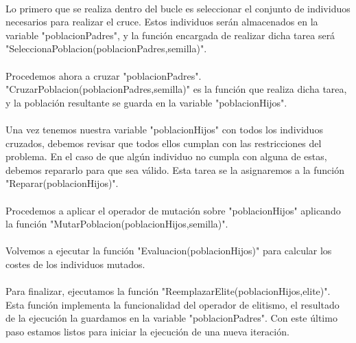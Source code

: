 	\paragraph{}Lo primero que se realiza dentro del bucle es seleccionar el conjunto de individuos necesarios para realizar el cruce. Estos individuos serán almacenados en la variable "poblacionPadres", y la función encargada de realizar dicha tarea será "SeleccionaPoblacion(poblacionPadres,semilla)".

	\paragraph{}Procedemos ahora a cruzar "poblacionPadres". "CruzarPoblacion(poblacionPadres,semilla)" es la función que realiza dicha tarea, y la población resultante se guarda en la variable "poblacionHijos".
	
	\paragraph{}Una vez tenemos nuestra variable "poblacionHijos" con todos los individuos cruzados, debemos revisar que todos ellos cumplan con las restricciones del problema. En el caso de que algún individuo no cumpla con alguna de estas, debemos repararlo para que sea válido. Esta tarea se la asignaremos a la función "Reparar(poblacionHijos)".
	
	\paragraph{}Procedemos a aplicar el operador de mutación sobre "poblacionHijos" aplicando la función "MutarPoblacion(poblacionHijos,semilla)".
	
	\paragraph{}Volvemos a ejecutar la función "Evaluacion(poblacionHijos)" para calcular los costes de los individuos mutados.
	
	\paragraph{}Para finalizar, ejecutamos la función "ReemplazarElite(poblacionHijos,elite)". Esta función implementa la funcionalidad del operador de elitismo, el resultado de la ejecución la guardamos en la variable "poblacionPadres". Con este último paso estamos listos para iniciar la ejecución de una nueva iteración.
		
